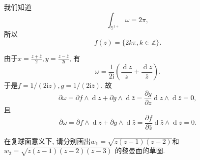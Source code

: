 \documentclass[a4paper,12pt]{ctexart}
\DeclareMathOperator{\diff}{d}
\newcommand{\mi}{\mathrm{i}}
\begin{document}
    \begin{solution}
        我们知道
        \begin{equation}
            \int_{\mathbb{S}^{1+}}{\omega} = 2\pi,
        \end{equation}
        所以
        \begin{equation}
            f(z) = \{2k\pi, k\in\mathbb{Z}\}.
        \end{equation}

        由于$\displaystyle x=\frac{z+\bar{z}}{2}, y=\frac{z-\bar{z}}{2\mi}$,
        有
        \begin{equation}
            \omega = \frac{1}{2\mi}(\frac{\diff z}{z}+
            \frac{\diff \bar{z}}{\bar{z}}). 
        \end{equation}
        于是$f=1/(2\mi z), g=1/(2\mi\bar{z})$.
        故
        \begin{equation}
            \partial\omega=\partial f\wedge\diff z
                +\partial g\wedge\diff \bar{z}
            =
            \frac{\partial g}{\partial z}\diff z\wedge\diff \bar{z}
            =
            0,
        \end{equation}
        且
        \begin{equation}
            \bar{\partial}\omega=\bar{\partial} f\wedge\diff z
                +\bar{\partial} g\wedge\diff \bar{z}
            =
            \frac{\partial f}{\partial \bar{z}}\diff \bar{z}\wedge\diff z
            =
            0.
        \end{equation}
    \end{solution}

    \begin{problem}
        在复球面意义下, 请分别画出$w_{1}=\sqrt{z(z-1)(z-2)}$和
        $w_{2}=\sqrt{z(z-1)(z-2)(z-3)}$
        的黎曼面的草图.
    \end{problem}
\end{document}

